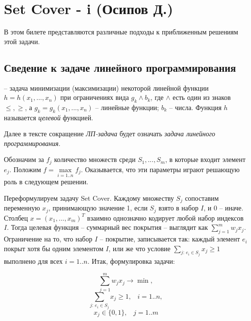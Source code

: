 \hypertarget{setcover}{\section{Set Cover - i (Осипов Д.)}}


В этом билете представляются различные подходы к приближенным решениям этой задачи. 

\subsection{Сведение к задаче линейного программирования}

 -- задача минимизации (максимизации) некоторой линейной функции $h = h(x_1, ..., x_n)$ при ограничениях вида $g_k \land b_k$, где $\land$ есть один из знаков $\leq, \geq$, а $g_k = g_k(x_1, ..., x_n)$ -- линейные функции; $b_k$ -- числа. Функция $h$ называется \textit{целевой} функцией.

Далее в тексте сокращение \textit{ЛП-задача} будет означать \textit{задача линейного программирования}.

Обозначим за $f_j$ количество множеств среди $S_1, ..., S_m$, в которые входит элемент $e_j$. Положим $f = \max\limits_{i=1..n} f_j$. Оказывается, что эти параметры играют решающую роль в следующем решении.

Переформулируем задачу Set Cover. Каждому множеству $S_j$ сопоставим переменную $x_j$, принимающую значение 1, если $S_j$ взято в набор $I$, и 0 -- иначе. Столбец $x = (x_1, ..., x_m)^T$ взаимно однозначно кодирует любой набор индексов $I$. Тогда целевая функция -- суммарный вес покрытия -- выглядит как $\sum\limits_{j=1}^m w_j x_j$. Ограничение на то, что набор $I$ -- покрытие, записывается так: каждый элемент $e_i$ покрыт хотя бы одним элементом $I$, или же что условие $\sum\limits_{j:\, e_i \in S_j} x_j \geq 1$ выполнено для всех $i=1..n$. Итак, формулировка задачи:

$$\sum_{j=1}^m w_j x_j \rightarrow \min,$$
$$\sum_{j:\, e_i \in S_j} x_j \geq 1, \;\;\; i=1..n,$$
$$x_j \in \{0, 1\}, \;\;\; j=1..m$$

